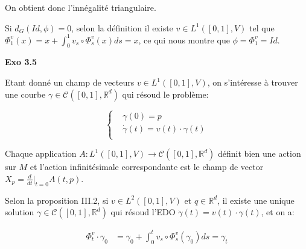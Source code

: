 \documentclass[11pt]{article}
\begin{document}
    On obtient donc l'innégalité triangulaire.

    Si $d_G (Id, \phi) = 0$, selon la définition il existe $v \in L^1([0, 1], V)$ tel que $\Phi_1^v (x) = x + \int_0^1 v_s \circ \Phi_s^v (x) ds = x$, ce qui nous montre que $\phi = \Phi_1^v = Id$.


    \textbf{Exo 3.5}

    Etant donné un champ de vecteurs $v \in L^1 ([0, 1], V)$, on s'intéresse à trouver une courbe $\gamma \in \mathcal{C}([0,1], \mathbb{R}^d)$ qui résoud le problème:

    \vspace{-2em} 
    $$
    \begin{cases}
      &\gamma(0) = p \\
      &\dot{\gamma}(t) = v(t) \cdot \gamma(t) \\
    \end{cases}
    $$
    \vspace{-2em} 

    Chaque application $A: L^1([0, 1], V) \to \mathscr{C}([0,1], \mathbb{R}^d)$ définit bien une action sur $M$ et l'action infinitésimale correspondante est le champ de vector $X_p = \frac{d}{dt}|_{t=0} A(t, p)$.

    Selon la proposition III.2, si $v \in L^2([0, 1], V)$ et $q \in \mathbb{R}^d$, il existe une unique solution $\gamma \in \mathscr{C}([0,1],\mathbb{R}^d)$ qui résoud l'EDO $\dot{\gamma}(t) = v(t) \cdot \gamma(t)$, et on a:

    \vspace{-4em}
    \begin{align*}
      \Phi_t^v \cdot \gamma_0 &= \gamma_0 + \int_0^t v_s \circ \Phi_s^v (\gamma_0) ds = \gamma_t
    \end{align*}
    \vspace{-4em}




    
\end{document}
